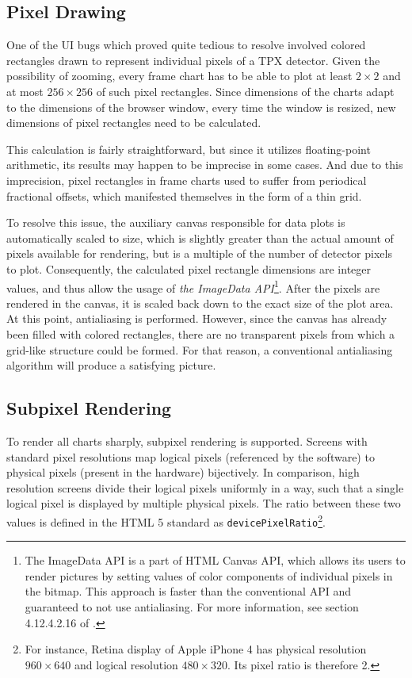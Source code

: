 \subsection{Pixel Drawing}
One of the UI bugs which proved quite tedious to resolve involved colored rectangles drawn to represent individual pixels of a TPX detector. Given the possibility of zooming, every frame chart has to be able to plot at least $2\times 2$ and at most $256\times 256$ of such pixel rectangles. Since dimensions of the charts adapt to the dimensions of the browser window, every time the window is resized, new dimensions of pixel rectangles need to be calculated.

This calculation is fairly straightforward, but since it utilizes floating-point arithmetic, its results may happen to be imprecise in some cases. And due to this imprecision, pixel rectangles in frame charts used to suffer from periodical fractional offsets, which manifested themselves in the form of a thin grid.

To resolve this issue, the auxiliary canvas responsible for data plots is automatically scaled to size, which is slightly greater than the actual amount of pixels available for rendering, but is a multiple of the number of detector pixels to plot. Consequently, the calculated pixel rectangle dimensions are integer values, and thus allow the usage of \textit{the ImageData API}\footnote{The ImageData API is a part of HTML Canvas API, which allows its users to render pictures by setting values of color components of individual pixels in the bitmap. This approach is faster than the conventional API and guaranteed to not use antialiasing. For more information, see section 4.12.4.2.16 of \cite{HtmlStandard}.}. After the pixels are rendered in the canvas, it is scaled back down to the exact size of the plot area. At this point, antialiasing is performed. However, since the canvas has already been filled with colored rectangles, there are no transparent pixels from which a grid-like structure could be formed. For that reason, a conventional antialiasing algorithm will produce a satisfying picture.

\subsection{Subpixel Rendering}
To render all charts sharply, subpixel rendering is supported. Screens with standard pixel resolutions map logical pixels (referenced by the software) to physical pixels (present in the hardware) bijectively. In comparison, high resolution screens divide their logical pixels uniformly in a way, such that a single logical pixel is displayed by multiple physical pixels. The ratio between these two values is defined in the HTML 5 standard \cite{HtmlStandard} as \texttt{devicePixelRatio}\footnote{For instance, Retina display of Apple iPhone 4 has physical resolution $960\times 640$ and logical resolution $480\times 320$. Its pixel ratio is therefore 2.}.

